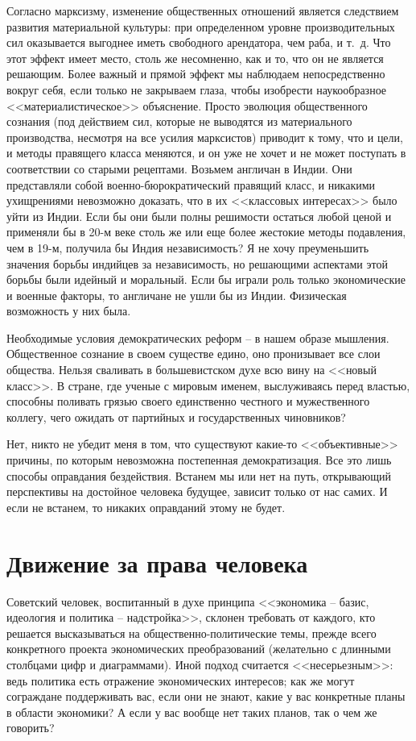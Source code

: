 \documentclass{book}
\begin{document}
Согласно марксизму, изменение общественных отношений является следствием развития материальной культуры: при определенном уровне производительных сил оказывается выгоднее иметь свободного арендатора, чем раба, и т.~д. Что этот эффект имеет место, столь же несомненно, как и то, что он не является решающим. Более важный и прямой эффект мы наблюдаем непосредственно вокруг себя, если только не закрываем глаза, чтобы изобрести наукообразное <<материалистическое>> объяснение. Просто эволюция общественного сознания (под действием сил, которые не выводятся из материального производства, несмотря на все усилия марксистов) приводит к тому, что и цели, и методы правящего класса меняются, и он уже не хочет и не может поступать в соответствии со ста­рыми рецептами. Возьмем англичан в Индии. Они представля­ли собой военно-бюрократический правящий класс, и никаки­ми ухищрениями невозможно доказать, что в их <<классовых интересах>> было уйти из Индии. Если бы они были полны реши­мости остаться любой ценой и применяли бы в 20-м 
веке столь же или еще более жестокие методы подавления, чем в 19-м, получила бы Индия независимость? Я не хочу преуменьшить значения борьбы индийцев за независимость, но решающими ас­пектами этой борьбы были идейный и моральный. Если бы играли роль только экономические и военные факторы, то англичане не ушли бы из Индии. Физическая возможность у них была.

Необходимые условия демократических реформ -- в нашем образе мышления. Общественное сознание в своем существе едино, оно пронизывает все слои общества. Нельзя сваливать в большевистском духе всю вину на <<новый класс>>. В стране, где ученые с мировым именем, выслуживаясь перед властью, способны поливать грязью своего единственно честного и мужественного коллегу, чего ожидать от партийных и государственных чиновников?

Нет, никто не убедит меня в том, что существуют какие-то <<объективные>> причины, по которым невозможна постепенная демократизация. Все это лишь способы оправдания бездействия. Встанем мы или нет на путь, открывающий перспективы на достойное человека будущее, зависит только от нас самих. И если не встанем, то никаких оправданий этому не будет.



\section{Движение за права человека}

Советский человек, воспитанный в духе принципа <<экономика -- базис, идеология и политика -- надстройка>>, склонен требовать от каждого, кто решается высказываться на обще­ственно-политические темы, прежде всего конкретного проекта экономических преобразований (желательно с длинными столбцами цифр и диаграммами). Иной подход считается <<несерьезным>>: ведь политика есть отражение экономических интересов; как же могут сограждане поддерживать вас, если они не знают, какие у вас конкретные планы в области экономики? А если у вас вообще нет таких планов, так о чем же говорить?
\end{document}
